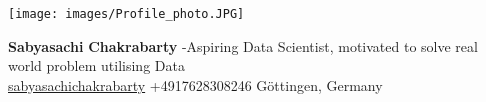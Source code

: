 \documentclass[letterpaper]{deedy-resume} %
\begin{document}

\lastupdated %

\hspace{0.5cm}
\vspace{-2cm}
\begin{minipage}[h]{0.25\textwidth} %
    \texttt{[image: images/Profile\_photo.JPG]}
\end{minipage}

\hfill

\hspace{4cm}
\begin{minipage}[t]{0.7\textwidth}
    \namesection
    {\bf Sabyasachi}
    {\bf Chakrabarty}
    { %
        \hspace{-0.5cm} -Aspiring Data Scientist, motivated to solve real world problem utilising Data\\
        \faEnvelope \hspace{1pt} \href{mailto:sabyasachichakrbarty.96@gmail.com}{sabyasachichakrabarty}
        \hspace{3pt} \faMobile \hspace{1pt} +4917628308246
        \hspace{3pt} \faMapMarker \hspace{1pt} {Göttingen, Germany}
        }
\end{minipage}


\end{document}
